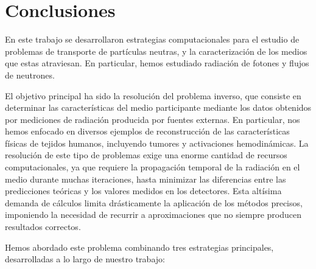 
\pagestyle{fancy}
\chapter{Conclusiones}
\label{cap:conc}
\lhead{\thepage}
\vspace{0.01\textheight}
\pagebreak
 
En este trabajo se desarrollaron estrategias computacionales para el 
estudio de problemas de transporte de partículas neutras, y la 
caracterización de los medios que estas atraviesan.
En particular, hemos estudiado radiación de fotones y 
flujos de neutrones.

El objetivo principal ha sido la resolución del 
problema inverso, que consiste en determinar las características 
del medio participante mediante los datos obtenidos por mediciones 
de radiación producida por fuentes externas.
En particular, nos hemos enfocado en diversos ejemplos de 
reconstrucción de las características físicas de tejidos humanos, 
incluyendo tumores y activaciones hemodinámicas.
La resolución de este tipo de problemas exige una enorme cantidad 
de recursos computacionales, ya que requiere la propagación temporal 
de la radiación en el medio durante muchas iteraciones, 
hasta minimizar las diferencias entre las predicciones teóricas y 
los valores medidos en los detectores. 
Esta altísima demanda de cálculos limita drásticamente 
la aplicación de los métodos precisos, imponiendo la necesidad de 
recurrir a aproximaciones que no siempre producen resultados correctos.

Hemos abordado este problema combinando tres estrategias principales, 
desarrolladas a lo largo de nuestro trabajo:

